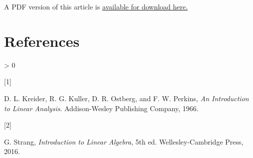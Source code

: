 \documentclass[
  12pt,
  a4paper,
]{article}
\newlength{\cslhangindent}
\newlength{\csllabelwidth}
\newenvironment{CSLReferences}[2] %
 {%
  \setlength{\parindent}{0pt}
  \ifodd #1 \everypar{\setlength{\hangindent}{\cslhangindent}}\ignorespaces\fi
  \ifnum #2 > 0
  \setlength{\parskip}{#2\baselineskip}
  \fi
 }%
 {}
\newcommand{\CSLLeftMargin}[1]{\parbox[t]{\csllabelwidth}{#1}}
\newcommand{\CSLRightInline}[1]{\parbox[t]{\linewidth - \csllabelwidth}{#1}\break}
\begin{document}
A PDF version of this article is
\href{./eigenvalues-and-eigenvectors.pdf}{available for download here.}

\hypertarget{bibliography}{%
\section*{References}\label{bibliography}}

\hypertarget{refs}{}
\begin{CSLReferences}{0}{0}
\leavevmode\hypertarget{ref-kkop1966}{}%
\CSLLeftMargin{{[}1{]} }
\CSLRightInline{D. L. Kreider, R. G. Kuller, D. R. Ostberg, and F. W.
Perkins, \emph{{An Introduction to Linear Analysis}}. Addison-Wesley
Publishing Company, 1966. }

\leavevmode\hypertarget{ref-strang2016}{}%
\CSLLeftMargin{{[}2{]} }
\CSLRightInline{G. Strang, \emph{{Introduction to Linear Algebra}}, 5th
ed. Wellesley-Cambridge Press, 2016. }

\end{CSLReferences}
\end{document}
